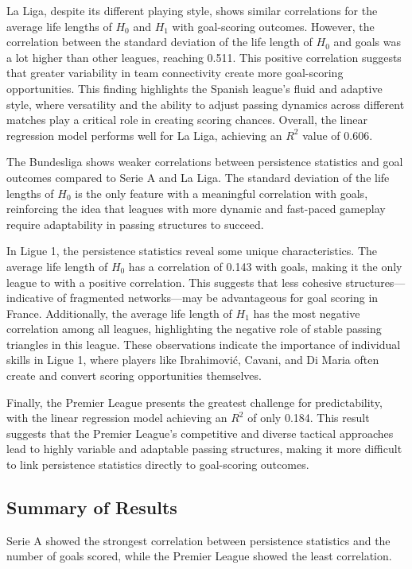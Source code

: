 \documentclass[10pt,twocolumn]{article}
\begin{document}
La Liga, despite its different playing style, shows similar correlations for the average life lengths of $ H_0 $ and $ H_1 $ with goal-scoring outcomes. However, the correlation between the standard deviation of the life length of $ H_0 $ and goals was a lot higher than other leagues, reaching 0.511. This positive correlation suggests that greater variability in team connectivity create more goal-scoring opportunities. This finding highlights the Spanish league's fluid and adaptive style, where versatility and the ability to adjust passing dynamics across different matches play a critical role in creating scoring chances. Overall, the linear regression model performs well for La Liga, achieving an $ R^2 $ value of 0.606.

The Bundesliga shows weaker correlations between persistence statistics and goal outcomes compared to Serie A and La Liga. The standard deviation of the life lengths of $ H_0 $ is the only feature with a meaningful correlation with goals, reinforcing the idea that leagues with more dynamic and fast-paced gameplay require adaptability in passing structures to succeed.

In Ligue 1, the persistence statistics reveal some unique characteristics. The average life length of $ H_0 $ has a correlation of 0.143 with goals, making it the only league to with a positive correlation. This suggests that less cohesive structures—indicative of fragmented networks—may be advantageous for goal scoring in France. Additionally, the average life length of $ H_1 $ has the most negative correlation among all leagues, highlighting the negative role of stable passing triangles in this league. These observations indicate the importance of individual skills in Ligue 1, where players like Ibrahimović, Cavani, and Di Maria often create and convert scoring opportunities themselves.

Finally, the Premier League presents the greatest challenge for predictability, with the linear regression model achieving an $ R^2 $ of only 0.184. This result suggests that the Premier League’s competitive and diverse tactical approaches lead to highly variable and adaptable passing structures, making it more difficult to link persistence statistics directly to goal-scoring outcomes.


\subsection*{Summary of Results}
Serie A showed the strongest correlation between persistence statistics and the number of goals scored, while the Premier League showed the least correlation. 
\end{document}
